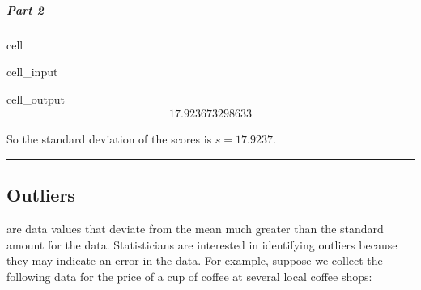 \documentclass[letterpaper,10pt,english]{jupyterBook}
\begin{document}
\subparagraph{Part 2}
\label{\detokenize{Ch2 Descriptive Statistics/2.3 Measures of Dispersion:id4}}
\begin{sphinxuseclass}{cell}\begin{sphinxVerbatimInput}

\begin{sphinxuseclass}{cell_input}
\begin{sphinxVerbatim}[commandchars=\\\{\}]
\end{sphinxVerbatim}

\end{sphinxuseclass}\end{sphinxVerbatimInput}
\begin{sphinxVerbatimOutput}

\begin{sphinxuseclass}{cell_output}\begin{equation*}
\begin{split}17.923673298633\end{split}
\end{equation*}
\end{sphinxuseclass}\end{sphinxVerbatimOutput}

\end{sphinxuseclass}
\sphinxAtStartPar
So the standard deviation of the scores is \(s = 17.9237\).


\bigskip\hrule\bigskip



\subsection{Outliers}
\label{\detokenize{Ch2 Descriptive Statistics/2.3 Measures of Dispersion:outliers}}
\sphinxAtStartPar
{} are data values that deviate from the mean much greater than the standard amount for the data. Statisticians are interested in identifying outliers because they may indicate an error in the data. For example, suppose we collect the following data for the price of a cup of coffee at several local coffee shops:
\end{document}
